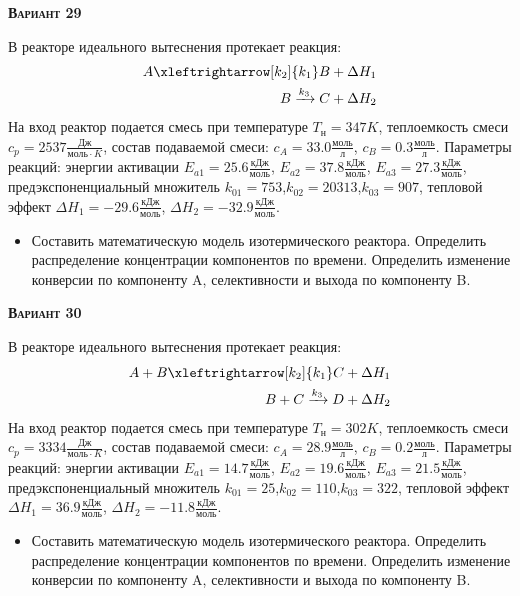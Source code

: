 \textsc{\textbf{Вариант 29}}

 В реакторе идеального вытеснения протекает реакция: \begin{equation*} \begin{aligned} A \xleftrightarrow[k_2]{k_1} B + \Delta H_1 \\ B \xrightarrow{k_3} C + \Delta H_2 \end{aligned} \end{equation*}                              На вход  реактор подается смесь при температуре $ T_{н} =  347 K$, теплоемкость смеси $c_p= 2537 \frac{Дж}{моль \cdot K}$, состав подаваемой смеси: $c_A=33.0 \frac{моль}{л}$, $c_B=0.3 \frac{моль}{л}$. Параметры реакций: энергии активации $E_{a1}=25.6 \frac{кДж}{моль}$, $E_{a2}=37.8  \frac{кДж}{моль}$, $E_{a3}=27.3  \frac{кДж}{моль}$, предэкспоненциальный множитель $k_{01}=       753$,$k_{02}=     20313$,$k_{03}=       907$, тепловой эффект $\Delta H_1= -29.6  \frac{кДж}{моль}$, $\Delta H_2=-32.9 \frac{кДж}{моль}$.\begin{itemize} \item Составить математическую модель изотермического реактора. Определить распределение концентрации компонентов по времени. Определить изменение конверсии по компоненту A, селективности и выхода по компоненту B. \end{itemize}

\textsc{\textbf{Вариант 30}}

 В реакторе идеального вытеснения протекает реакция: \begin{equation*} \begin{aligned} A+B \xleftrightarrow[k_2]{k_1} C + \Delta H_1 \\ B + C \xrightarrow{k_3} D + \Delta H_2 \end{aligned} \end{equation*}                        На вход  реактор подается смесь при температуре $ T_{н} =  302 K$, теплоемкость смеси $c_p= 3334 \frac{Дж}{моль \cdot K}$, состав подаваемой смеси: $c_A=28.9 \frac{моль}{л}$, $c_B=0.2 \frac{моль}{л}$. Параметры реакций: энергии активации $E_{a1}=14.7 \frac{кДж}{моль}$, $E_{a2}=19.6  \frac{кДж}{моль}$, $E_{a3}=21.5  \frac{кДж}{моль}$, предэкспоненциальный множитель $k_{01}=        25$,$k_{02}=       110$,$k_{03}=       322$, тепловой эффект $\Delta H_1= 36.9  \frac{кДж}{моль}$, $\Delta H_2=-11.8 \frac{кДж}{моль}$.\begin{itemize} \item Составить математическую модель изотермического реактора. Определить распределение концентрации компонентов по времени. Определить изменение конверсии по компоненту A, селективности и выхода по компоненту B. \end{itemize}


